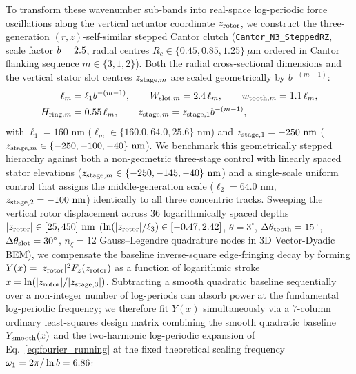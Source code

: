 \documentclass[pdflatex,sn-nature]{sn-jnl}
\DeclareRobustCommand{\roundtwo}[1]{\fpeval{round(#1,2)}}
\begin{document}
To transform these wavenumber sub-bands into real-space log-periodic force oscillations along the vertical actuator coordinate $z_{\rm rotor}$, we construct the three-generation $(r,z)$-self-similar stepped Cantor clutch (\texttt{Cantor\_N3\_SteppedRZ}, scale factor $b = 2.5{}$, radial centres $R_c \in \{0.45, 0.85, 1.25\}\ \mu\text{m}$ ordered in Cantor flanking sequence $m \in \{3, 1, 2\}$). Both the radial cross-sectional dimensions and the vertical stator slot centres $z_{{\rm stage},m}$ are scaled geometrically by $b^{-(m-1)}$:
\begin{equation}
\begin{aligned}
\ell_m &= \ell_1 b^{-(m-1)}, \qquad
W_{{\rm slot},m} = 2.4\,\ell_m, \qquad
w_{{\rm tooth},m} = 1.1\,\ell_m, \\
H_{{\rm ring},m} &= 0.55\,\ell_m, \qquad
z_{{\rm stage},m} = z_{{\rm stage},1} b^{-(m-1)},
\end{aligned}
\label{eq:methods_stepped_rz}
\end{equation}
with $\ell_1 = 160\text{ nm}$ ($\ell_m \in \{160.0, 64.0, 25.6\}\text{ nm}$) and $z_{{\rm stage},1} = -250\text{ nm}$ ($z_{{\rm stage},m} \in \{-250, -100, -40\}\text{ nm}$). We benchmark this geometrically stepped hierarchy against both a non-geometric three-stage control with linearly spaced stator elevations ($z_{{\rm stage},m} \in \{-250, -145, -40\}\text{ nm}$) and a single-scale uniform control that assigns the middle-generation scale ($\ell_2 = 64.0\text{ nm}$, $z_{{\rm stage},2} = -100\text{ nm}$) identically to all three concentric tracks. Sweeping the vertical rotor displacement across $36$ logarithmically spaced depths $|z_{\rm rotor}| \in [25, 450]\text{ nm}$ ($\ln(|z_{\rm rotor}|/\ell_3) \in [-0.47, 2.42]$, $\theta = 3^\circ$, $\Delta\theta_{\rm tooth} = 15^\circ$, $\Delta\theta_{\rm slot} = 30^\circ$, $n_\xi = 12$ Gauss--Legendre quadrature nodes in 3D Vector-Dyadic BEM), we compensate the baseline inverse-square edge-fringing decay by forming $Y(x) = |z_{\rm rotor}|^2 F_z(z_{\rm rotor})$ as a function of logarithmic stroke $x = \ln(|z_{\rm rotor}| / |z_{{\rm stage},3}|)$. Subtracting a smooth quadratic baseline sequentially over a non-integer number of log-periods can absorb power at the fundamental log-periodic frequency; we therefore fit $Y(x)$ simultaneously via a $7$-column ordinary least-squares design matrix combining the smooth quadratic baseline $Y_{\rm smooth}(x)$ and the two-harmonic log-periodic expansion of Eq.~\eqref{eq:fourier_running} at the fixed theoretical scaling frequency $\omega_1 = 2\pi / \ln b = \roundtwo{\LogperSteppedRzOmegaone}$:
\end{document}
